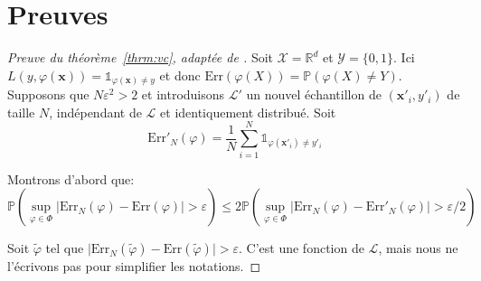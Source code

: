
\cleardoublepage
{}
\chapter{Preuves}

\begin{proof}[Preuve du théorème~\ref{thrm:vc}, adaptée de \citet{Devroye1997}]\label{preuve:vc}
    Soit $\mathcal{X} = \mathbb{R}^d$ et $\mathcal{Y} = \{0,1\}$. Ici $L(y,\varphi(\mathbf{x})) = \mathds{1}_{\varphi (\mathbf{x}) \neq y}$ et donc $\mathrm{Err} ( \varphi (X) ) = \mathbb{P} ( \varphi (X) \neq Y )$. Supposons que $N \varepsilon^2 > 2$ et introduisons $\mathcal{L}'$ un nouvel échantillon de $(\mathbf{x}'_i,y'_i)$ de taille $N$, indépendant de $\mathcal{L}$ et identiquement distribué. Soit
    \begin{equation*}
        \mathrm{Err}'_N ( \varphi ) = \frac{1}{N} \sum_{i=1}^N \mathds{1}_{\varphi( \mathbf{x}'_i ) \neq y'_i}
    \end{equation*}
    
    Montrons d'abord que:
    \begin{equation*}
        \mathbb{P} \left( \sup_{\varphi \in \Phi} \vert \mathrm{Err}_N ( \varphi ) - \mathrm{Err} (\varphi) \vert > \varepsilon \right) \leq 2 \mathbb{P} \left( \sup_{\varphi \in \Phi} \vert \mathrm{Err}_N ( \varphi ) - \mathrm{Err}'_N (\varphi) \vert > \varepsilon/2 \right)
    \end{equation*}
    
    Soit $\tilde{\varphi}$ tel que $\vert \mathrm{Err}_N ( \tilde{\varphi} ) - \mathrm{Err} (\tilde{\varphi}) \vert > \varepsilon$. C'est une fonction de $\mathcal{L}$, mais nous ne l'écrivons pas pour simplifier les notations.
    

\end{proof}
